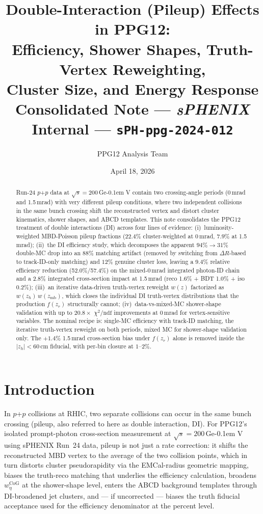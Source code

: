 \documentclass[11pt,a4paper]{article}
\title{\LARGE\textbf{Double-Interaction (Pileup) Effects in PPG12:\\
Efficiency, Shower Shapes, Truth-Vertex Reweighting,\\
Cluster Size, and Energy Response}\\[6pt]
\large Consolidated Note ---
\textbf{\textit{sPHENIX} Internal} ---
\texttt{sPH-ppg-2024-012}}
\author{PPG12 Analysis Team}
\date{April 18, 2026}
\newcommand{\wetacog}{\ensuremath{w_{\eta}^{\mathrm{CoG}}}\xspace}
\newcommand{\chidf}{\ensuremath{\chi^2/\mathrm{ndf}}\xspace}
\newcommand{\DR}{\ensuremath{\Delta R}\xspace}
\newcommand{\pp}{\mbox{$p$+$p$}\xspace}
\newcommand{\GeV}{\ifmmode {\mathrm{\ Ge\kern -0.1em V}}\else\textrm{Ge\kern -0.1em V}\fi\xspace}
\begin{document}
\maketitle

\begin{abstract}\noindent
Run-24 \pp data at $\sqrt{s} = 200$\,\GeV contain two crossing-angle periods
(0\,mrad and 1.5\,mrad) with very different pileup conditions, where two
independent collisions in the same bunch crossing shift the reconstructed
vertex and distort cluster kinematics, shower shapes, and ABCD templates.
This note consolidates the PPG12 treatment of double interactions (DI) across
four lines of evidence: (i)~luminosity-weighted MBD-Poisson pileup fractions
($22.4\%$ cluster-weighted at 0\,mrad, $7.9\%$ at 1.5\,mrad);
(ii)~the DI efficiency study, which decomposes the apparent $94\%\to 31\%$
double-MC drop into an $88\%$ matching artifact (removed by switching from
$\DR$-based to track-ID-only matching) and $12\%$ genuine cluster loss,
leaving a $9.4\%$ relative efficiency reduction (52.0\%/57.4\%) on the
mixed-0\,mrad integrated photon-ID chain and a 2.8\% integrated
cross-section impact at 1.5\,mrad (reco 1.6\% + BDT 1.0\% + iso 0.2\%);
(iii)~an iterative data-driven truth-vertex reweight $w(z)$ factorized as
$w(z_h)\,w(z_\mathrm{mb})$, which closes the individual DI truth-vertex
distributions that the production $f(z_r)$ structurally cannot;
(iv)~data-vs-mixed-MC shower-shape validation with up to $20.8\times$
\chidf improvements at 0\,mrad for vertex-sensitive variables.
The nominal recipe is: single-MC efficiency with track-ID matching, the
iterative truth-vertex reweight on both periods, mixed MC for shower-shape
validation only. The $+1.4\%$ 1.5\,mrad cross-section bias under
$f(z_r)$ alone is removed inside the $|z_h|<60$\,cm fiducial, with per-bin
closure at $1$--$2\%$.
\end{abstract}

\tableofcontents
\clearpage

\section{Introduction}
\label{sec:intro}

In \pp collisions at RHIC, two separate collisions can occur in the same
bunch crossing (pileup, also referred to here as double interaction, DI).
For PPG12's isolated prompt-photon cross-section measurement at
$\sqrt{s}=200$\,\GeV using sPHENIX Run~24 data, pileup is not just a
rate correction: it shifts the reconstructed MBD vertex to the average of
the two collision points, which in turn distorts cluster pseudorapidity
via the EMCal-radius geometric mapping, biases the truth-reco matching
that underlies the efficiency calculation, broadens \wetacog at the
shower-shape level, enters the ABCD background templates through
DI-broadened jet clusters, and --- if uncorrected --- biases the truth
fiducial acceptance used for the efficiency denominator at the
percent level.
\end{document}

